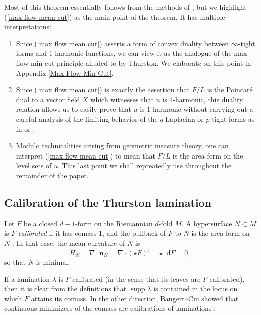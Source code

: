 \documentclass[reqno,11pt]{amsart}
\newcommand*\dif{\mathop{}\!\mathrm{d}}
\DeclareMathOperator{\supp}{supp}
\newcommand{\normal}{\mathbf n}
\newcommand{\dfn}[1]{\emph{#1}\index{#1}}
\theoremstyle{definition}
\numberwithin{equation}{section}
\begin{document}
Most of this theorem essentially follows from the methods of \cite{Mazon14,daskalopoulos2020transverse}, but we highlight (\ref{max flow mean cut}) as the main point of the theorem.
It has multiple interpretations:
\begin{enumerate}
\item Since (\ref{max flow mean cut}) asserts a form of convex duality between $\infty$-tight forms and $1$-harmonic functions, we can view it as the analogue of the max flow min cut principle alluded to by Thurston. We elaborate on this point in Appendix \ref{Max Flow Min Cut}.
\item Since (\ref{max flow mean cut}) is exactly the assertion that $F/L$ is the Poincar\'e dual to a vector field $X$ which witnesses that $u$ is $1$-harmonic, this duality relation allows us to easily prove that $u$ is $1$-harmonic without carrying out a careful analysis of the limiting behavior of the $q$-Laplacian or $p$-tight forms as in \cite[Theorem 2.4]{Mazon14} or \cite[\S6]{daskalopoulos2020transverse}.
\item Modulo technicalities arising from geometric measure theory, one can interpret (\ref{max flow mean cut}) to mean that $F/L$ is the area form on the level sets of $u$. This last point we shall repreatedly use throughout the remainder of the paper.
\end{enumerate}


\subsection{Calibration of the Thurston lamination}
Let $F$ be a closed $d-1$-form on the Riemannian $d$-fold $M$.
A hypersurface $N \subset M$ is $F$-\dfn{calibrated} if it has comass $1$, and the pullback of $F$ to $N$ is the area form on $N$ \cite{Harvey82}.
In that case, the mean curvature of $N$ is 
\begin{equation}\label{calibrated surfaces are minimal}
H_N = \nabla \cdot \normal_N = \nabla \cdot (\star F)^\sharp = \star \dif F = 0,
\end{equation}
so that $N$ is minimal. 

If a lamination $\lambda$ is $F$-calibrated (in the sense that its leaves are $F$-calibrated), then it is clear from the definitions that $\supp \lambda$ is contained in the locus on which $F$ attains its comass.
In the other direction, Bangert--Cui showed that continuous minimizers of the comass are calibrations of laminations \cite{bangert_cui_2017}:
\end{document}

